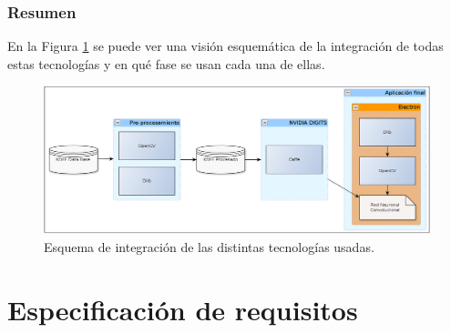 \documentclass[a4paper,11pt]{book}
\begin{document}
\subsubsection{Resumen}
En la Figura \ref{fig:integracion} se puede ver una visión esquemática de la integración de todas estas tecnologías y en qué fase se usan cada una de ellas.
\begin{figure}[h]
\centering
\includegraphics[width=1.0\linewidth]{imagenes/integracion}
\caption[Integración]{Esquema de integración de las distintas tecnologías usadas.}
\label{fig:integracion}
\end{figure}


\section{Especificación de requisitos}\label{sec:requisitos}






\end{document}
